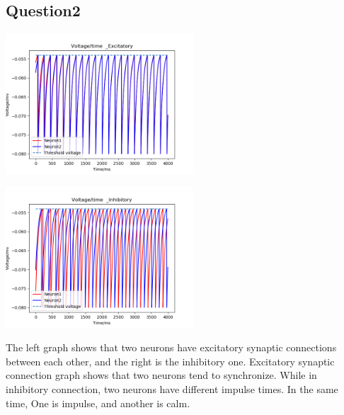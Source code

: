 \documentclass[fleqn,11pt]{article}
\begin{document}
\subsection*{Question2}
\begin{center}
    \begin{minipage}{\linewidth} 
    \begin{minipage}{0.45\linewidth}
      \includegraphics[width=7cm]{graphs/Question2_Excitatory.png}
    \end{minipage}
    \hspace{0.05\linewidth}
    \begin{minipage}{0.45\linewidth}
      \includegraphics[width=7cm]{graphs/Question2_Inhibitory.png}
    \end{minipage}
  \end{minipage} 
\end{center}
\par The left graph shows that two neurons have excitatory synaptic connections
    between each other, and the right is the inhibitory one. 
    Excitatory synaptic connection graph  shows that two neurons tend to synchronize.
    While in inhibitory connection, two neurons have different impulse times. 
    In the same time, One is impulse, and another is calm.                         
\newpage
\end{document}
